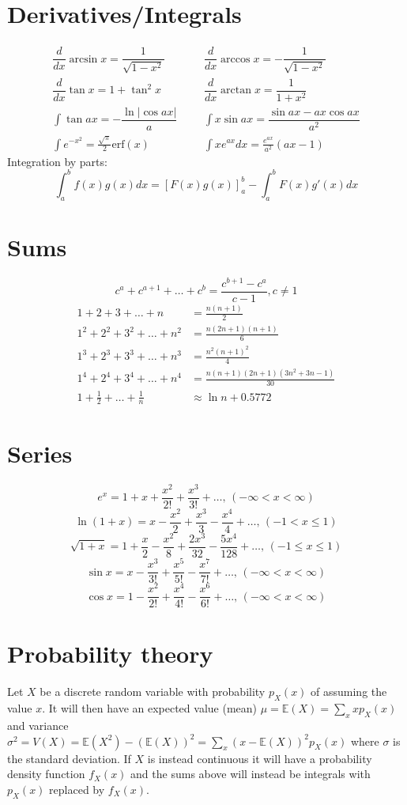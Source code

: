 \section{Derivatives/Integrals}
\begin{align*}
	\dfrac{d}{dx}\arcsin x = \dfrac{1}{\sqrt{1-x^2}} &&& \dfrac{d}{dx}\arccos x = -\dfrac{1}{\sqrt{1-x^2}} \\
	\dfrac{d}{dx}\tan x = 1+\tan^2 x &&& \dfrac{d}{dx}\arctan x = \dfrac{1}{1+x^2} \\
	\int\tan ax = -\dfrac{\ln|\cos ax|}{a} &&& \int x\sin ax = \dfrac{\sin ax-ax \cos ax}{a^2} \\
	\int e^{-x^2} = \frac{\sqrt \pi}{2} \text{erf}(x) &&& \int xe^{ax}dx = \frac{e^{ax}}{a^2}(ax-1)
\end{align*}
Integration by parts:
\[\int_a^bf(x)g(x)dx = [F(x)g(x)]_a^b-\int_a^bF(x)g'(x)dx\]

\section{Sums}
\[ c^a + c^{a+1} + \dots + c^{b} = \frac{c^{b+1} - c^a}{c-1}, c \neq 1 \]
\begin{align*}
	1 + 2 + 3 + \dots + n &= \frac{n(n+1)}{2} \\
	1^2 + 2^2 + 3^2 + \dots + n^2 &= \frac{n(2n+1)(n+1)}{6} \\
	1^3 + 2^3 + 3^3 + \dots + n^3 &= \frac{n^2(n+1)^2}{4} \\
	1^4 + 2^4 + 3^4 + \dots + n^4 &= \frac{n(n+1)(2n+1)(3n^2 + 3n - 1)}{30} \\
	1 + \frac12 + \dots + \frac1n &\approx \ln n + 0.5772
\end{align*}

\section{Series}
$$e^x = 1+x+\frac{x^2}{2!}+\frac{x^3}{3!}+\dots,\,(-\infty<x<\infty)$$
$$\ln(1+x) = x-\frac{x^2}{2}+\frac{x^3}{3}-\frac{x^4}{4}+\dots,\,(-1<x\leq1)$$
$$\sqrt{1+x} = 1+\frac{x}{2}-\frac{x^2}{8}+\frac{2x^3}{32}-\frac{5x^4}{128}+\dots,\,(-1\leq x\leq1)$$
$$\sin x = x-\frac{x^3}{3!}+\frac{x^5}{5!}-\frac{x^7}{7!}+\dots,\,(-\infty<x<\infty)$$
$$\cos x = 1-\frac{x^2}{2!}+\frac{x^4}{4!}-\frac{x^6}{6!}+\dots,\,(-\infty<x<\infty)$$

\section{Probability theory}
Let $X$ be a discrete random variable with probability $p_X(x)$ of assuming the value $x$. It will then have an expected value (mean) $\mu=\mathbb{E}(X)=\sum_xxp_X(x)$ and variance $\sigma^2=V(X)=\mathbb{E}(X^2)-(\mathbb{E}(X))^2=\sum_x(x-\mathbb{E}(X))^2p_X(x)$ where $\sigma$ is the standard deviation. If $X$ is instead continuous it will have a probability density function $f_X(x)$ and the sums above will instead be integrals with $p_X(x)$ replaced by $f_X(x)$.

